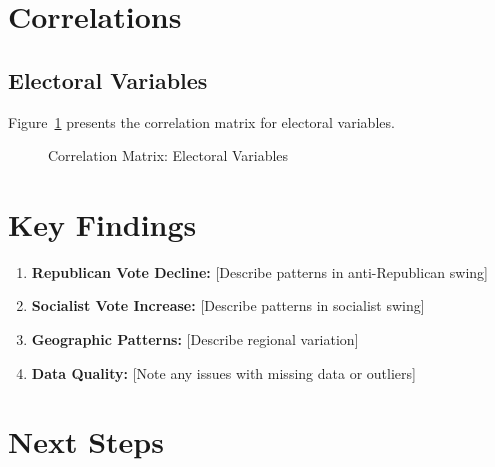 \documentclass[11pt]{article}
\begin{document}

\section{Correlations}

\subsection{Electoral Variables}

Figure~\ref{fig:correlations} presents the correlation matrix for electoral variables.

\begin{figure}[H]
\centering
\caption{Correlation Matrix: Electoral Variables}
\label{fig:correlations}
\end{figure}

\section{Key Findings}

\begin{enumerate}
    \item \textbf{Republican Vote Decline:} [Describe patterns in anti-Republican swing]
    
    \item \textbf{Socialist Vote Increase:} [Describe patterns in socialist swing]
    
    \item \textbf{Geographic Patterns:} [Describe regional variation]
    
    \item \textbf{Data Quality:} [Note any issues with missing data or outliers]
\end{enumerate}

\section{Next Steps}
\end{document}

